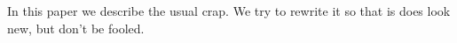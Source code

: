 
In this paper we describe the usual crap. We try to rewrite it so that is does look new, but don't be fooled.

